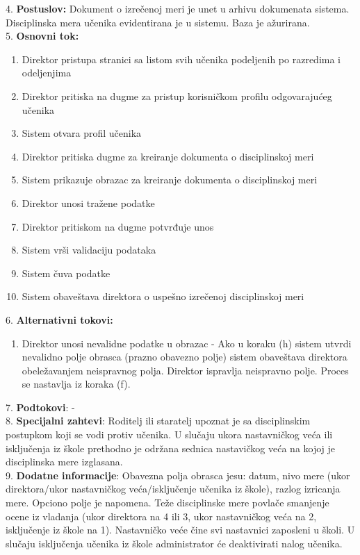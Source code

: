 \documentclass{article}
\begin{document}
4. \textbf{Postuslov:} Dokument o izrečenoj meri je unet u arhivu dokumenata sistema. Disciplinska mera učenika evidentirana je u sistemu. Baza je ažurirana. \\

5. \textbf{Osnovni tok:} 
\begin{enumerate} [label=(\alph*)]
\item Direktor pristupa stranici sa listom svih učenika podeljenih po razredima i odeljenjima 
\item Direktor pritiska na dugme za pristup korisničkom profilu odgovarajućeg učenika
\item Sistem otvara profil učenika
\item Direktor pritiska dugme za kreiranje dokumenta o disciplinskoj meri
\item Sistem prikazuje obrazac za kreiranje dokumenta o disciplinskoj meri 
\item Direktor unosi tražene podatke
\item Direktor pritiskom na dugme potvrđuje unos
\item Sistem vrši validaciju podataka
\item Sistem čuva podatke
\item Sistem obaveštava direktora o uspešno izrečenoj disciplinskoj meri
\end{enumerate}

6. \textbf{Alternativni tokovi:}
\begin{enumerate} [label=(\roman*)]
\item Direktor unosi nevalidne podatke u obrazac - Ako u koraku (h) sistem utvrdi nevalidno polje obrasca (prazno obavezno polje) sistem obaveštava direktora obeležavanjem neispravnog polja. Direktor ispravlja neispravno polje. Proces se nastavlja iz koraka (f).
\end{enumerate}

7. \textbf{Podtokovi}: - \\

8. \textbf{Specijalni zahtevi}: Roditelj ili staratelj upoznat je sa disciplinskim postupkom koji se vodi protiv učenika. U slučaju ukora nastavničkog veća ili isključenja iz škole prethodno je održana sednica nastavičkog veća na kojoj je disciplinska mere izglasana. \\

9. \textbf{Dodatne informacije}: Obavezna polja obrasca jesu: datum, nivo mere (ukor direktora/ukor nastavničkog veća/isključenje učenika iz škole), razlog izricanja mere. Opciono polje je napomena. Teže disciplinske mere povlače smanjenje ocene iz vladanja (ukor direktora na 4 ili 3, ukor nastavničkog veća na 2, isključenje iz škole na 1). Nastavničko veće čine svi nastavnici zaposleni u školi. U slučaju isključenja učenika iz škole administrator će deaktivirati nalog učenika. \\
\end{document}

